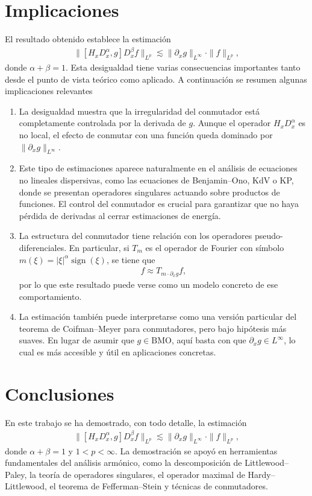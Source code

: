 \documentclass{aleph-revista}
\begin{document}
\section{Implicaciones}
  El resultado obtenido establece la estimación
  \begin{align*}
    \| [H_x D_x^\alpha, g] D_x^\beta f \|_{L^p} \lesssim \| \partial_x g \|_{L^\infty} \cdot \|f\|_{L^p},
  \end{align*}
  donde $\alpha + \beta = 1$. Esta desigualdad tiene varias consecuencias importantes tanto desde el punto de vista teórico como aplicado. A continuación se resumen algunas implicaciones relevantes 
  \begin{enumerate}
    \item La desigualdad muestra que la irregularidad del conmutador está completamente controlada por la derivada de $g$. Aunque el operador $H_x D_x^\alpha$ es no local, el efecto de conmutar con una función queda dominado por $\|\partial_x g\|_{L^\infty}$.
    \item Este tipo de estimaciones aparece naturalmente en el análisis de ecuaciones no lineales dispersivas, como las ecuaciones de Benjamin–Ono, KdV o KP, donde se presentan operadores singulares actuando sobre productos de funciones. El control del conmutador es crucial para garantizar que no haya pérdida de derivadas al cerrar estimaciones de energía.
    \item La estructura del conmutador tiene relación con los operadores pseudo-diferenciales. En particular, si $T_m$ es el operador de Fourier con símbolo $m(\xi) = |\xi|^\alpha \operatorname{sign}(\xi)$, se tiene que
      \begin{align*}
        [T_m, g] f \approx T_{m \cdot \partial_x g} f,
      \end{align*}
      por lo que este resultado puede verse como un modelo concreto de ese comportamiento.
    \item La estimación también puede interpretarse como una versión particular del teorema de Coifman–Meyer para conmutadores, pero bajo hipótesis más suaves. En lugar de asumir que $g \in \mathrm{BMO}$, aquí basta con que $\partial_x g \in L^\infty$, lo cual es más accesible y útil en aplicaciones concretas.
  \end{enumerate}
\section{Conclusiones}
En este trabajo se ha demostrado, con todo detalle, la estimación
\begin{align*}
  \| [H_x D_x^\alpha, g] D_x^\beta f \|_{L^p} \lesssim \| \partial_x g \|_{L^\infty} \cdot \|f\|_{L^p},
\end{align*}
donde $\alpha + \beta = 1$ y $1 < p < \infty$. La demostración se apoyó en herramientas fundamentales del análisis armónico, como la descomposición de Littlewood–Paley, la teoría de operadores singulares, el operador maximal de Hardy–Littlewood, el teorema de Fefferman–Stein y técnicas de conmutadores.
\end{document}
